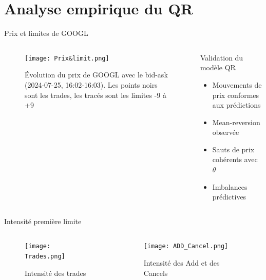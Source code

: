 \documentclass[aspectratio=169]{beamer}  %
\begin{document}
\section{Analyse empirique du QR}

\begin{frame}{Prix et limites de GOOGL}
    \begin{columns}
        \begin{column}{0.7\textwidth}
            \begin{figure}
                \centering
                \texttt{[image: Prix\&limit.png]}
                \caption{Évolution du prix de GOOGL avec le bid-ask (2024-07-25, 16:02-16:03). Les points noirs sont les trades, les tracés sont les limites -9 à +9}
            \end{figure}
        \end{column}
        \begin{column}{0.3\textwidth}
            \begin{alertblock}{Validation du modèle QR}
                \begin{itemize}
                    \item Mouvements de prix conformes aux prédictions
                    \item Mean-reversion observée
                    \item Sauts de prix cohérents avec $\theta$
                    \item Imbalances prédictives
                \end{itemize}
            \end{alertblock}
        \end{column}
    \end{columns}
\end{frame}

\begin{frame}{Intensité première limite}
    \begin{columns}
        \begin{column}{0.48\textwidth}
            \begin{figure}
                \centering
                \texttt{[image: Trades.png]}
                \caption{Intensité des trades}
            \end{figure}
        \end{column}
        \begin{column}{0.48\textwidth}
            \begin{figure}
                \centering
                \texttt{[image: ADD\_Cancel.png]}
                \caption{Intensité des Add et des Cancels}
            \end{figure}
        \end{column}
    \end{columns}
\end{frame}
\end{document}
